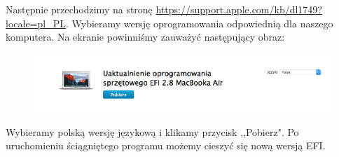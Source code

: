 \documentclass{article}
\begin{document}
Następnie przechodzimy na stronę \url{https://support.apple.com/kb/dl1749?locale=pl_PL}. Wybieramy wersję oprogramowania odpowiednią dla naszego komputera. Na ekranie powinniśmy zauważyć następujący obraz:

\begin{figure}[h!]
\centering
\includegraphics[scale=0.4]{stronaapple}	
\end{figure}

Wybieramy polską wersję językową i klikamy przycisk ,,Pobierz". Po uruchomieniu ściągniętego programu możemy cieszyć się nową wersją EFI.
\end{document}
